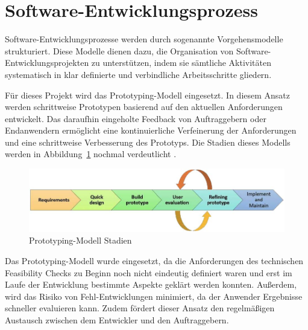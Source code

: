 \section{Software-Entwicklungsprozess}
Software-Entwicklungsprozesse werden durch sogenannte Vorgehensmodelle strukturiert. Diese Modelle dienen dazu, die Organisation von Software-Entwicklungsprojekten zu unterstützen, indem sie sämtliche Aktivitäten systematisch in klar definierte und verbindliche Arbeitsschritte gliedern.

Für dieses Projekt wird das Prototyping-Modell eingesetzt. In diesem Ansatz werden schrittweise Prototypen basierend auf den aktuellen Anforderungen entwickelt. Das daraufhin eingeholte Feedback von Auftraggebern oder Endanwendern ermöglicht eine kontinuierliche Verfeinerung der Anforderungen und eine schrittweise Verbesserung des Prototyps. Die Stadien dieses Modells werden in Abbildung~\ref{fig:Prototyping-Modell} nochmal verdeutlicht \cite{senarath2021waterfall}.

\begin{figure}[h!]
    \centering
    \includegraphics[]{bilder/Prototyping_Stages.jpg}
    \caption{Prototyping-Modell Stadien \cite{senarath2021waterfall}}
    \label{fig:Prototyping-Modell}
\end{figure}


Das Prototyping-Modell wurde eingesetzt, da die Anforderungen des technischen Feasibility Checks zu Beginn noch nicht eindeutig definiert waren und erst im Laufe der Entwicklung bestimmte Aspekte geklärt werden konnten. Außerdem, wird das Risiko von Fehl-Entwicklungen minimiert, da der Anwender Ergebnisse schneller evaluieren kann. Zudem fördert dieser Ansatz den regelmäßigen Austausch zwischen dem Entwickler und den Auftraggebern.